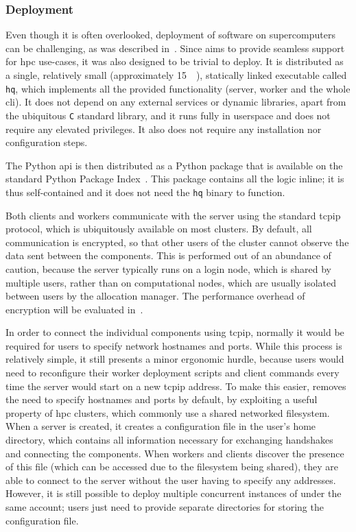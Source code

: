 \subsubsection*{Deployment}
Even though it is often overlooked, deployment of software on supercomputers can be challenging, as
was described in~. Since \hyperqueue{} aims to provide seamless
support for \gls{hpc} use-cases, it was also designed to be trivial to deploy. It is
distributed as a single, relatively small (approximately \SI{15}{\mebi\byte}), statically
linked executable called \texttt{hq}, which implements all the provided functionality
(server, worker and the whole \gls{cli}). It does not depend on any external services
or dynamic libraries, apart from the ubiquitous \texttt{C} standard library, and it
runs fully in userspace and does not require any elevated privileges. It also does not require any
installation nor configuration steps.

The \hyperqueue{} Python \gls{api} is then distributed as a Python package
that is available on the standard Python Package Index~\cite{hq_pypi}. This package
contains all the \hq{} logic inline; it is thus self-contained and it does not
need the \texttt{hq} binary to function.

Both clients and workers communicate with the server using the standard \gls{tcpip}
protocol, which is ubiquitously available on most clusters. By default, all communication is
encrypted, so that other users of the cluster cannot observe the data sent between the
\hyperqueue{} components. This is performed out of an abundance of caution, because the
server typically runs on a login node, which is shared by multiple users, rather than on
computational nodes, which are usually isolated between users by the allocation manager. The
performance overhead of encryption will be evaluated in~.

In order to connect the individual components using \gls{tcpip}, normally it would be
required for users to specify network hostnames and ports. While this process is relatively simple,
it still presents a minor ergonomic hurdle, because users would need to reconfigure their worker
deployment scripts and client commands every time the server would start on a new
\gls{tcpip} address. To make this easier, \hyperqueue{} removes the need to
specify hostnames and ports by default, by exploiting a useful property of \gls{hpc}
clusters, which commonly use a shared networked filesystem. When a server is created, it creates a
configuration file in the user's home directory, which contains all information necessary for
exchanging handshakes and connecting the components. When workers and clients discover the presence
of this file (which can be accessed due to the filesystem being shared), they are able to connect
to the server without the user having to specify any addresses. However, it is still possible to
deploy multiple concurrent instances of \hyperqueue{} under the same account; users just
need to provide separate directories for storing the configuration file.

